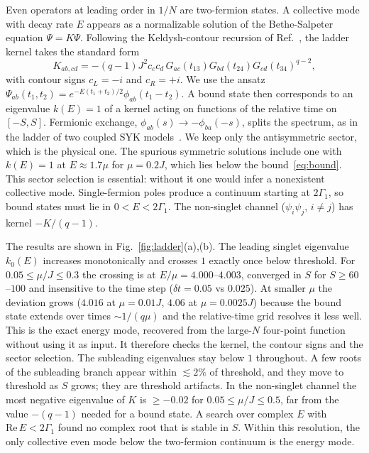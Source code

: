 \documentclass[aps,pre,twocolumn,superscriptaddress,amsmath,amssymb,10pt]{revtex4-2}
\begin{document}
Even operators at leading order in $1/N$ are two-fermion states. A collective mode with decay rate $E$ appears as a normalizable solution of the Bethe-Salpeter equation $\Psi=K\Psi$. Following the Keldysh-contour recursion of Ref.~\cite{Liu2026}, the ladder kernel takes the standard form~\cite{MS2016,Garcia2024}
\begin{equation}
K_{ab,cd}=-(q-1)J^2c_cc_d\,G_{ac}(t_{13})G_{bd}(t_{24})G_{cd}(t_{34})^{q-2},
\end{equation}
with contour signs $c_{L}=-i$ and $c_{R}=+i$. We use the ansatz $\Psi_{ab}(t_1,t_2)=e^{-E(t_1+t_2)/2}\phi_{ab}(t_1-t_2)$. A bound state then corresponds to an eigenvalue $k(E)=1$ of a kernel acting on functions of the relative time on $[-S,S]$. Fermionic exchange, $\phi_{ab}(s)\to-\phi_{ba}(-s)$, splits the spectrum, as in the ladder of two coupled SYK models~\cite{Nosaka2020}. We keep only the antisymmetric sector, which is the physical one. The spurious symmetric solutions include one with $k(E)=1$ at $E\approx1.7\mu$ for $\mu=0.2J$, which lies below the bound~\eqref{eq:bound}. This sector selection is essential: without it one would infer a nonexistent collective mode. Single-fermion poles produce a continuum starting at $2\Gamma_1$, so bound states must lie in $0<E<2\Gamma_1$. The non-singlet channel ($\psi_i\psi_j$, $i\neq j$) has kernel $-K/(q-1)$.

The results are shown in Fig.~\ref{fig:ladder}(a),(b). The leading singlet eigenvalue $k_0(E)$ increases monotonically and crosses $1$ exactly once below threshold. For $0.05\le\mu/J\le0.3$ the crossing is at $E/\mu=4.000$--$4.003$, converged in $S$ for $S\ge60$--$100$ and insensitive to the time step ($\delta t=0.05$ vs $0.025$). At smaller $\mu$ the deviation grows ($4.016$ at $\mu=0.01J$, $4.06$ at $\mu=0.0025J$) because the bound state extends over times $\sim1/(q\mu)$ and the relative-time grid resolves it less well. This is the exact energy mode, recovered from the large-$N$ four-point function without using it as input. It therefore checks the kernel, the contour signs and the sector selection. The subleading eigenvalues stay below $1$ throughout. A few roots of the subleading branch appear within $\lesssim2\%$ of threshold, and they move to threshold as $S$ grows; they are threshold artifacts. In the non-singlet channel the most negative eigenvalue of $K$ is $\ge-0.02$ for $0.05\le\mu/J\le0.5$, far from the value $-(q-1)$ needed for a bound state. A search over complex $E$ with $\mathrm{Re}\,E<2\Gamma_1$ found no complex root that is stable in $S$. Within this resolution, the only collective even mode below the two-fermion continuum is the energy mode.
\end{document}
